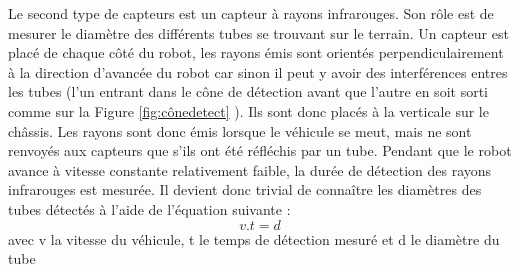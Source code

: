 \documentclass[a4paper,11pt]{article}
\begin{document}
Le second type de capteurs est un capteur à rayons infrarouges. Son rôle est de mesurer le diamètre des différents tubes se trouvant sur le terrain. Un capteur est placé de chaque côté du robot, les rayons émis sont orientés perpendiculairement à la direction d'avancée du robot car sinon il peut y avoir des interférences entres les tubes (l'un entrant dans le cône de détection avant que l'autre en soit sorti comme sur la Figure \ref{fig:cônedetect} ). Ils sont donc placés à la verticale sur le châssis. Les rayons sont donc émis lorsque le véhicule se meut, mais ne sont renvoyés aux capteurs que s'ils ont été réfléchis par un tube. Pendant que le robot avance à vitesse constante relativement faible, la durée de détection des rayons infrarouges est mesurée. Il devient donc trivial de connaître les diamètres des tubes détectés à l'aide de l'équation suivante :
\begin{equation*}
    v . t = d
\end{equation*}
avec v la vitesse du véhicule, t le temps de détection mesuré et d le diamètre du tube
\end{document}
